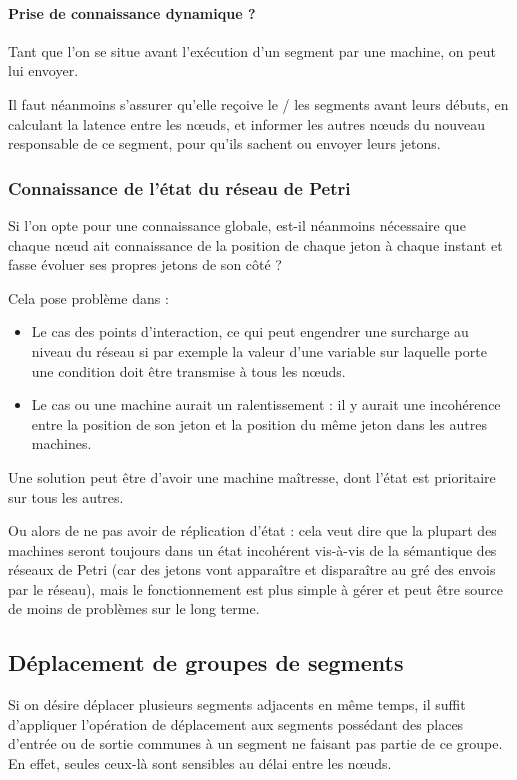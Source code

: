 \paragraph{Prise de connaissance dynamique ?}
Tant que l'on se situe avant l'exécution d'un segment par une machine, on peut lui envoyer.

Il faut néanmoins s'assurer qu'elle reçoive le / les segments avant leurs débuts, en calculant la latence entre les nœuds, et informer les autres nœuds du nouveau responsable de ce segment, pour qu'ils sachent ou envoyer leurs jetons.

\subsubsection{Connaissance de l'état du réseau de Petri}
Si l'on opte pour une connaissance globale, est-il néanmoins nécessaire que chaque nœud ait connaissance de la position de chaque jeton à chaque instant et fasse évoluer ses propres jetons de son côté ? 

Cela pose problème dans :
\begin{itemize}
\item Le cas des points d'interaction, ce qui peut engendrer une surcharge au niveau du réseau si par exemple la valeur d'une variable sur laquelle porte une condition doit être transmise à tous les nœuds.
\item Le cas ou une machine aurait un ralentissement : il y aurait une incohérence entre la position de son jeton et la position du même jeton dans les autres machines.
\end{itemize}

Une solution peut être d'avoir une machine maîtresse, dont l'état est prioritaire sur tous les autres. 

Ou alors de ne pas avoir de réplication d'état : cela veut dire que la plupart des machines seront toujours dans un état incohérent vis-à-vis de la sémantique des réseaux de Petri (car des jetons vont apparaître et disparaître au gré des envois par le réseau), mais le fonctionnement est plus simple à gérer et peut être source de moins de problèmes sur le long terme.

\subsection{Déplacement de groupes de segments}
Si on désire déplacer plusieurs segments adjacents en même temps, il suffit d'appliquer l'opération de déplacement aux segments possédant des places d'entrée ou de sortie communes à un segment ne faisant pas partie de ce groupe. En effet, seules ceux-là sont sensibles au délai entre les nœuds.

